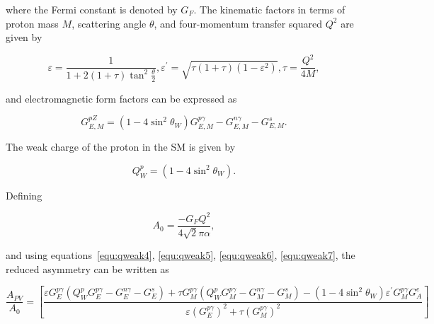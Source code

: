 \noindent
where the Fermi constant is denoted by $G_{F}$. The kinematic factors in terms of proton mass $M$, scattering angle $\theta$, and four-momentum transfer squared $Q^{2}$ are given by

\begin{equation} \label{equ:qweak5}
{\varepsilon} = \frac{1}{1 + 2(1+{\tau})\tan^{2}\frac{\theta}{2}}, {\varepsilon^{\prime}} = \sqrt{{\tau}(1+{\tau})(1 - {\varepsilon}^{2})}, {\tau} = \frac{Q^{2}}{4M},
\end{equation}

\noindent
and electromagnetic form factors can be expressed as

\begin{equation} \label{equ:qweak6}
G_{E,M}^{pZ} = (1 - 4\sin^{2} \theta_{W}) {G_{E,M}^{p\gamma}} - {G_{E,M}^{n\gamma}} - {G_{E,M}^{s}}.
\end{equation}

The weak charge of the proton in the SM is given by 

\begin{equation} \label{equ:qweak7}
Q_{W}^{p} = (1-4\sin^{2}\theta_{W}).
\end{equation}

\noindent
Defining 

\begin{equation} \label{equ:qweak8}
A_{0} = \frac{-G_{F}Q^{2}}{4 \sqrt{2}\pi\alpha},
\end{equation}

\noindent
and using equations~\ref{equ:qweak4}, \ref{equ:qweak5}, \ref{equ:qweak6}, \ref{equ:qweak7}, the reduced asymmetry can be written as 

\begin{equation} \label{equ:qweak9}
\frac{A_{PV}}{A_{0}} = \left[ \frac{{\varepsilon} {G_{E}^{p\gamma}} (Q_{W}^{p} {G_{E}^{p\gamma}} - {G_{E}^{n\gamma}} - {G_{E}^{s}} ) + {\tau} {G_{M}^{p\gamma}} (Q_{W}^{p} {G_{M}^{p\gamma}} - {G_{M}^{n\gamma}} - {G_{M}^{s}} ) - (1-4\sin^{2}\theta_{W}){\varepsilon^{\prime}}{G_{M}^{p\gamma}}{G_{A}^{e}} } { {\varepsilon}({G_{E}^{p\gamma}})^{2} + {\tau}({G_{M}^{p\gamma}})^{2} } \right]
\end{equation}

%

